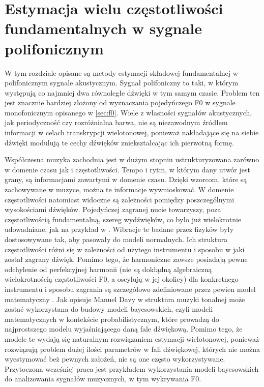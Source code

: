 \documentclass[12pt,a4paper,twoside]{mwart}
\begin{document}
\newpage
\section{Estymacja wielu częstotliwości fundamentalnych w sygnale polifonicznym}\label{sec:MultiPitch}
W tym rozdziale opisane są metody estymacji składowej fundamentalnej w polifonicznym sygnale akustycznym. Sygnał polifoniczny to taki, w którym występują co najmniej dwa równoległe dźwięki w tym samym czasie. Problem ten jest znacznie bardziej złożony od wyznaczania pojedyńczego F0 w sygnale monofonicznym opisanego w \ref{sec:f0}. Wiele z własności sygnałów akustycznych, jak periodyczność czy rozróżnialna barwa, nie są niezawodnym źródłem informacji w celach transkrypcji wielotonowej, ponieważ nakładające się na siebie dźwięki modulują te cechy dźwięków zniekształcając ich pierwotną formę.

Współczesna muzyka zachodnia jest w dużym stopniu ustrukturyzowana zarówno w domenie czasu jak i częstotliwości. Tempo i rytm, w którym dany utwór jest grany, są informacjami zawartymi w domenie czasu. Dzięki wzorcom, które są zachowywane w muzyce, można te informacje wywnioskować. W domenie częstotliwości natomiast widoczne są zależności pomiędzy poszczególnymi wysokościami dźwięków. Pojedyńczej zagranej nucie towarzyszy, poza częstotliwością fundamentalną, szereg wydźwięków, co było już wielokrotnie udowadniane, jak na przykład w 
\cite[1325-1326]{Transcription:Mcintyre:OnTheOscilation}.
Wibracje te badane przez fizyków były dostosowywane tak, aby pasowały do modeli normalnych. Ich struktura częstotliwości różni się w zależności od użytego instrumentu i sposobu w jaki został zagrany dźwięk. Pomimo tego, że harmoniczne zawsze posiadają pewne odchylenie od perfekcyjnej harmonii (nie są dokłądną algebraiczną wielokrotnością częstotliwości F0, a oscylują w jej okolicy) dla konkretnego instrumentu i sposobu zagrania są szczegółowo zdefiniowane przez pewien model matematyczny 
\cite[1326-1327]{Transcription:Mcintyre:OnTheOscilation}.
Jak opisuje Manuel Davy w 
\cite[203-204]{Transcription:Anssi:SignalProcessingMethods} 
struktura muzyki tonalnej może zostać wykorzystana do budowy modeli bayesowskich, czyli modeli matematycznych w kontekście probabilistycznym, które prowadzą do najprostszego modelu wyjaśniającego daną fale dźwiękową. Pomimo tego, że modele te wydają się naturalnym rozwiązaniem estymacji wielotonowej, ponieważ rozwiązują problem dużej ilości parametrów w fali dźwiękowej, których nie można wyestymować beż pewnych założeń, nie są one często wykorzystywane. Przytoczona wcześniej praca \cite{Transcription:BayesianHarmonicModels} jest przykładem wykorzystania modeli bayesowskich do analizowania sygnałów muzycznych, w tym wykrywania F0.
\end{document}
